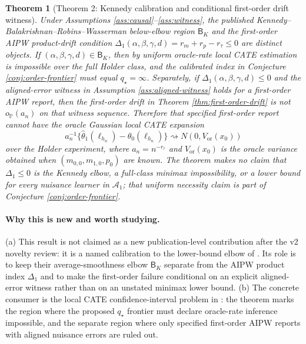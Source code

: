 \documentclass[11pt]{article}
\renewcommand{\Pr}{\mathbb{P}}
\theoremstyle{definition}
\theoremstyle{plain}
\newtheorem{theorem}{Theorem}
\theoremstyle{remark}
\begin{document}
\begin{theorem}[Theorem 2: Kennedy calibration and conditional first-order drift witness]\label{thm:kennedy-calibration}
Under Assumptions \ref{ass:causal}--\ref{ass:witness}, the published
Kennedy--Balakrishnan--Robins--Wasserman below-elbow region \(\mathsf B_K\)
and the first-order AIPW product-drift condition
\(\Delta_1(\alpha,\beta,\gamma,d)=r_m+r_p-r_\tau\le0\) are distinct objects.
If \((\alpha,\beta,\gamma,d)\in\mathsf B_K\), then by
\citet[\S2--\S4 and Theorems 1--2]{KennedyBalakrishnanRobinsWasserman2024MinimaxCATE}
uniform oracle-rate local CATE estimation is impossible over the full Holder
class, and the calibrated index in Conjecture \ref{conj:order-frontier} must
equal \(q_\star=\infty\).  Separately, if
\(\Delta_1(\alpha,\beta,\gamma,d)\le0\) and the aligned-error witness in
Assumption \ref{ass:aligned-witness} holds for a first-order AIPW report, then
the first-order drift in Theorem \ref{thm:first-order-drift} is not
\(o_{\Pr}(a_n)\) on that witness sequence.  Therefore that specified
first-order report cannot have the oracle Gaussian local CATE expansion
\[
a_n^{-1}\{\hat\theta_1(\ell_{h_n})-\theta_0(\ell_{h_n})\}
\rightsquigarrow N(0,V_{\mathrm{or}}(x_0))
\]
over the Holder experiment, where \(a_n=n^{-r_\tau}\) and
\(V_{\mathrm{or}}(x_0)\) is the oracle variance obtained when
\((m_{0,0},m_{1,0},p_0)\) are known.  The theorem makes no claim that
\(\Delta_1\le0\) is the Kennedy elbow, a full-class minimax impossibility, or
a lower bound for every nuisance learner in \(\mathcal A_1\); that uniform
necessity claim is part of Conjecture \ref{conj:order-frontier}.
\end{theorem}
\paragraph{Why this is new and worth studying.}
(a) This result is not claimed as a new publication-level contribution after
the v2 novelty review: it is a named calibration to the lower-bound elbow of
\citet[\S2--\S4 and Theorems 1--2]{KennedyBalakrishnanRobinsWasserman2024MinimaxCATE}.
Its role is to keep their average-smoothness elbow \(\mathsf B_K\) separate
from the AIPW product index \(\Delta_1\) and to make the first-order failure
conditional on an explicit aligned-error witness rather than on an unstated
minimax lower bound.  (b) The concrete consumer is the local CATE
confidence-interval problem in
\citet[\S2--\S4]{KennedyBalakrishnanRobinsWasserman2024MinimaxCATE}: the theorem
marks the region where the proposed \(q_\star\) frontier must declare
oracle-rate inference impossible, and the separate region where only
specified first-order AIPW reports with aligned nuisance errors are ruled out.
\end{document}
